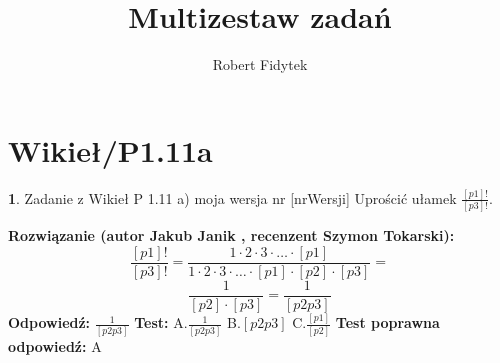 \documentclass[12pt, a4paper]{article}
\title{Multizestaw zadań}
\author{Robert Fidytek}
\date{}
\theoremstyle{definition} %
\newtheorem{zad}{}
\newcommand{\kategoria}[1]{\section{#1}} %
\newcommand{\zadStart}[1]{\begin{zad}#1\newline} %
\newcommand{\zadStop}{\end{zad}}   %
\newcommand{\rozwStart}[2]{\noindent \textbf{Rozwiązanie (autor #1 , recenzent #2): }\newline} %
\newcommand{\rozwStop}{\newline}                                            %
\newcommand{\odpStart}{\noindent \textbf{Odpowiedź:}\newline}    %
\newcommand{\odpStop}{\newline}                                             %
\newcommand{\testStart}{\noindent \textbf{Test:}\newline} %
\newcommand{\testStop}{\newline} %
\newcommand{\kluczStart}{\noindent \textbf{Test poprawna odpowiedź:}\newline} %
\newcommand{\kluczStop}{\newline} %
\begin{document}
\maketitle


\kategoria{Wikieł/P1.11a}
\zadStart{Zadanie z Wikieł P 1.11 a) moja wersja nr [nrWersji]}
Uprościć ułamek $\frac{[p1]!}{[p3]!}$.
\zadStop
\rozwStart{Jakub Janik}{Szymon Tokarski}
$$\frac{[p1]!}{[p3]!}=\frac{1\cdot2\cdot3\cdot \dots\cdot[p1]}{1\cdot2\cdot3\cdot \dots\cdot[p1]\cdot[p2]\cdot[p3]}= $$
$$\frac{1}{[p2]\cdot[p3]}=\frac{1}{[p2p3]} $$
\rozwStop
\odpStart
$\frac{1}{[p2p3]}$
\odpStop
\testStart
A.$\frac{1}{[p2p3]}$
B.$[p2p3]$
C.$\frac{[p1]}{[p2]}$
\testStop
\kluczStart
A
\kluczStop
\end{document}

